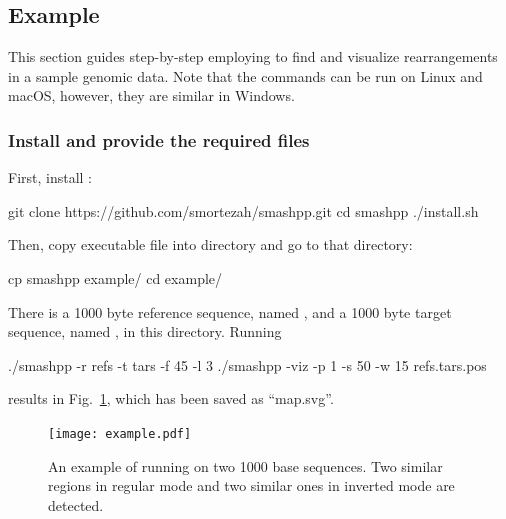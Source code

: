 


\subsection{Example}
This section guides step-by-step employing \smashpp to find and visualize rearrangements in a sample genomic data. Note that the commands can be run on Linux and macOS, however, they are similar in Windows.

\subsubsection*{Install \smashpp and provide the required files}
First, install \smashpp:
\begin{code}[style=bash]
git clone https://github.com/smortezah/smashpp.git
cd smashpp
./install.sh
\end{code}
Then, copy  executable file into  directory and go to that directory:
\begin{code}[style=bash]
cp smashpp example/
cd example/
\end{code}
There is a 1000 byte reference sequence, named , and a 1000 byte target sequence, named , in this directory. Running
\begin{code}[style=bash]
./smashpp -r refs -t tars -f 45 -l 3
./smashpp -viz -p 1 -s 50 -w 15 refs.tars.pos
\end{code}
results in Fig.~\ref{fig.example}, which has been saved as ``map.svg''.

\begin{figure}[!h]
  \texttt{[image: example.pdf]}
  \caption{An example of running \smashpp on two 1000 base sequences. Two similar regions in regular mode and two similar ones in inverted mode are detected.}
  \label{fig.example}
\end{figure}